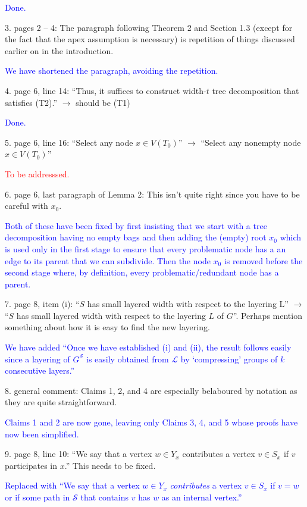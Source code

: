 \documentclass[12pt]{article}
\newcommand{\done}{\textcolor{blue}{Done.}}
\newcommand{\tba}{\textcolor{red}{To be addresssed.}}
\begin{document}
\done

3. pages 2 – 4: The paragraph following Theorem 2 and Section 1.3
(except for the fact that the apex assumption is necessary) is repetition
of things discussed earlier on in the introduction.

\textcolor{blue}{We have shortened the paragraph, avoiding the repetition.}

4. page 6, line 14: ``Thus, it suffices to construct width-$t$ tree decomposition that satisfies (T2).'' $\longrightarrow$ should be (T1)

\done

5. page 6, line 16: ``Select any node $x \in V (T_0)$'' $\longrightarrow$ ``Select any nonempty node $x \in V (T_0)$''

\tba

6. page 6, last paragraph of Lemma 2: This isn’t quite right since you
have to be careful with $x_0$.

\textcolor{blue}{Both of these have been fixed by first insisting that we start with a tree decomposition having no empty bags and then adding the (empty) root $x_0$ which is used only in the first stage to ensure that every problematic node has a an edge to its parent that we can subdivide.   Then the node $x_0$ is removed before the second stage where, by definition, every problematic/redundant node has a parent.} 

7. page 8, item (i): ``$S$ has small layered width with respect to the layering
L'' $\longrightarrow$ ``$S$ has small layered width with respect to the layering $L$ of
$G$''. Perhaps mention something about how it is easy to find the new layering.

\textcolor{blue}{We have added ``Once we have established (i) and (ii), the result follows easily since a layering of $G^\mathcal{S}$ is easily obtained from $\mathcal{L}$ by `compressing' groups of $k$ consecutive layers.''}

8. general comment: Claims 1, 2, and 4 are especially belaboured by
notation as they are quite straightforward.

\textcolor{blue}{Claims 1 and 2 are now gone, leaving only Claims 3, 4, and 5 whose proofs have now been simplified.}

9. page 8, line 10: ``We say that a vertex $w \in Y_x$ contributes a vertex
$v \in S_x$ if $v$ participates in $x$.'' This needs to be fixed.

\textcolor{blue}{Replaced with ``We say that a vertex $w\in Y_x$ \emph{contributes} a vertex $v\in S_x$ if $v=w$ or if some path in $\mathcal{S}$ that contains $v$ has $w$ as an internal vertex.''}
\end{document}
